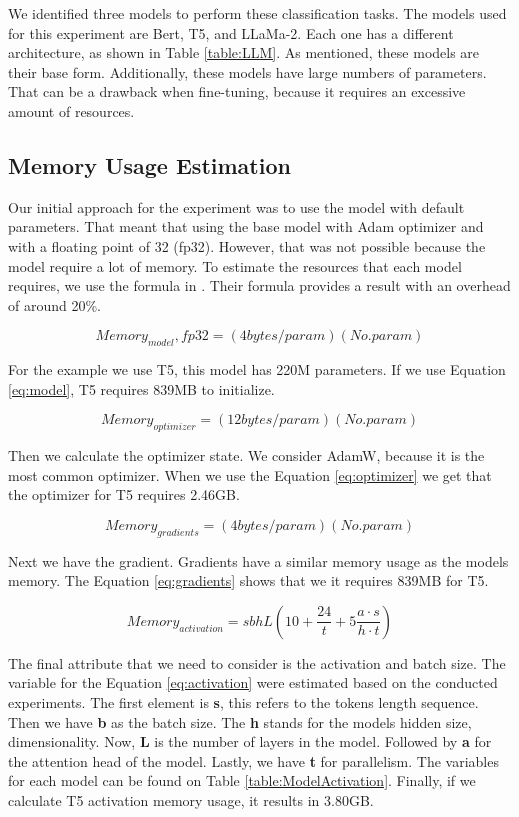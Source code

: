 We identified three models to perform these classification tasks. The models used for this experiment are Bert, T5, and LLaMa-2. Each one has a different architecture, as shown in Table \ref{table:LLM}. As mentioned, these models are their base form. Additionally, these models have large numbers of parameters. That can be a drawback when fine-tuning, because it requires an excessive amount of resources. 


\subsection{Memory Usage Estimation}
Our initial approach for the experiment was to use the model with default parameters. That meant that using the base model with Adam optimizer and with a floating point of 32 (fp32). However, that was not possible because the model require a lot of memory. To estimate the resources that each model requires, we use the formula in \cite{transformer-math-eleutherai}. Their formula provides a result with an overhead of around 20\%.


\[ Memory_{model}, fp32 = (4 bytes/param) (No. param) \label{eq:model} \tag{1} \] 

For the example we use T5, this model has 220M parameters. If we use Equation \ref{eq:model}, T5 requires 839MB to initialize. 


\[ Memory_{optimizer} = (12 bytes/param) (No. param) \label{eq:optimizer} \tag{2} \] 

Then we calculate the optimizer state. We consider AdamW, because it is the most common optimizer. When we use the Equation \ref{eq:optimizer} we get that the optimizer for T5 requires 2.46GB. 


\[ Memory_{gradients} = (4 bytes/param) (No. param) \label{eq:gradients} \tag{3} \] 

Next we have the gradient. Gradients have a similar memory usage as the models memory. The Equation \ref{eq:gradients} shows that we it requires 839MB for T5.


\[ Memory_{activation} = sbhL(10 + \frac{24}{t} + 5 \frac{a \cdot s}{h \cdot t} ) \label{eq:activation} \tag{4} \] 

The final attribute that we need to consider is the activation and batch size. The variable for the Equation \ref{eq:activation} were estimated based on the conducted experiments. The first element is \textbf{s}, this refers to the tokens length sequence. Then we have \textbf{b} as the batch size. The \textbf{h} stands for the models hidden size, dimensionality. Now, \textbf{L} is the number of layers in the model. Followed by \textbf{a} for the attention head of the model. Lastly, we have \textbf{t} for parallelism. The variables for each model can be found on Table \ref{table:ModelActivation}. Finally, if we calculate T5 activation memory usage, it results in 3.80GB.

